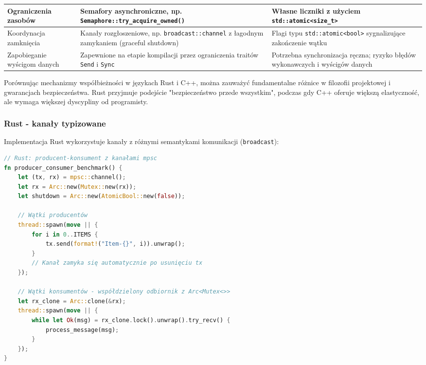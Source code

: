 \begin{table}[H]
\begin{tabularx}{\textwidth}{l>{\raggedright\arraybackslash}X>{\raggedright\arraybackslash}X}
        \midrule
        Ograniczenia zasobów &
        Semafory asynchroniczne, np. \texttt{Semaphore::try\_acquire\_owned()} &
        Własne liczniki z użyciem \texttt{std::atomic<size\_t>} \\
        \midrule
        Koordynacja zamknięcia &
        Kanały rozgłoszeniowe, np. \texttt{broadcast::channel} z łagodnym zamykaniem (graceful shutdown) &
        Flagi typu \texttt{std::atomic<bool>} sygnalizujące zakończenie wątku \\
        \midrule
        Zapobieganie wyścigom danych &
        Zapewnione na etapie kompilacji przez ograniczenia traitów \texttt{Send} i \texttt{Sync} &
        Potrzebna synchronizacja ręczna; ryzyko błędów wykonawczych i wyścigów danych \\
        \bottomrule
    \end{tabularx}
\end{table}


Porównując mechanizmy współbieżności w językach Rust i C++, można zauważyć fundamentalne różnice w filozofii projektowej i gwarancjach bezpieczeństwa. Rust przyjmuje podejście "bezpieczeństwo przede wszystkim", podczas gdy C++ oferuje większą elastyczność, ale wymaga większej dyscypliny od programisty.

\subsubsection{Rust - kanały typizowane}
Implementacja Rust wykorzystuje kanały z różnymi semantykami komunikacji (\texttt{broadcast}):
\begin{lstlisting}[language=Rust, caption={Producent-Konsument w Rust z mpsc channels}, label={lst:rust_producer_consumer}]
// Rust: producent-konsument z kanałami mpsc
fn producer_consumer_benchmark() {
    let (tx, rx) = mpsc::channel();
    let rx = Arc::new(Mutex::new(rx));
    let shutdown = Arc::new(AtomicBool::new(false));
    
    // Wątki producentów
    thread::spawn(move || {
        for i in 0..ITEMS {
            tx.send(format!("Item-{}", i)).unwrap();
        }
        // Kanał zamyka się automatycznie po usunięciu tx
    });

    // Wątki konsumentów - współdzielony odbiornik z Arc<Mutex<>>
    let rx_clone = Arc::clone(&rx);
    thread::spawn(move || {
        while let Ok(msg) = rx_clone.lock().unwrap().try_recv() {
            process_message(msg);
        }
    });
}
\end{lstlisting}

